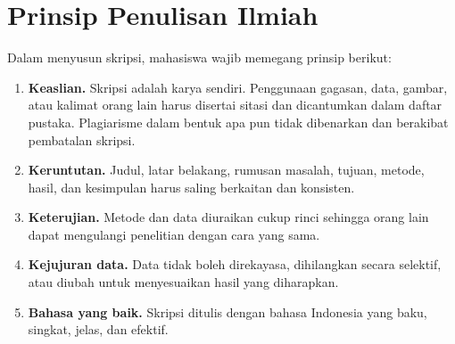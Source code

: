 \section{Prinsip Penulisan Ilmiah}
Dalam menyusun skripsi, mahasiswa wajib memegang prinsip berikut:
\begin{enumerate}
\item \textbf{Keaslian.} Skripsi adalah karya sendiri. Penggunaan gagasan, data, gambar, atau kalimat orang lain harus disertai sitasi dan dicantumkan dalam daftar pustaka. Plagiarisme dalam bentuk apa pun tidak dibenarkan dan berakibat pembatalan skripsi.
\item \textbf{Keruntutan.} Judul, latar belakang, rumusan masalah, tujuan, metode, hasil, dan kesimpulan harus saling berkaitan dan konsisten.
\item \textbf{Keterujian.} Metode dan data diuraikan cukup rinci sehingga orang lain dapat mengulangi penelitian dengan cara yang sama.
\item \textbf{Kejujuran data.} Data tidak boleh direkayasa, dihilangkan secara selektif, atau diubah untuk menyesuaikan hasil yang diharapkan.
\item \textbf{Bahasa yang baik.} Skripsi ditulis dengan bahasa Indonesia yang baku, singkat, jelas, dan efektif.
\end{enumerate}
